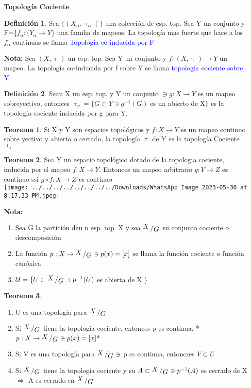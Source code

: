 \documentclass{article}
\theoremstyle{definition}
\newtheorem{definition}{Definición}[section]
\newtheorem{theorem}{Teorema}[section]
\newcommand{\bigslant}[2]{{\raisebox{.2em}{$#1$}\left/\raisebox{-.2em}{$#2$}\right.}}
\begin{document}
\begin{LARGE}
	\textbf{Topología Cociente}
\end{LARGE}
\begin{definition}
	Sea $\{(X_{\alpha},\uptau_{\alpha})\}$ una colección de esp. top. Sea Y un conjunto y F=\{$f_{\alpha}:(Y_{\alpha}\to Y$\} una familia de mapeos. La topología mas fuerte que hace a los $f_{\alpha}$ continuas se llama \textcolor{blue}{Topología co-inducida por F}\label{Topologia coinducida}
\end{definition}
\textbf{Nota: } Sea $(X,\uptau)$ un esp. top. Sea Y un conjunto y $f:(X,\uptau)\to Y$ un mapeo. La topología co-inducida por f sobre Y se llama \textcolor{blue}{topología cociente sobre Y}\label{Top. cociente}
\begin{definition}
	Sean X un esp. top. y Y un conjunto $\ni g:X\to Y$ es un mapeo sobreyectivo, entonces $\uptau_y=\{G\subset Y\ni g^{-1}(G)$ es un abierto de X$\}$ es la topología cociente inducida por g para Y.
\end{definition}
\begin{theorem}
	Si X y Y son espacios topológicos y $f:X\to Y$ es un mapeo continuo sobre yectivo y abierto o cerrado, la topología $\uptau$ de Y es la topología Cociente $\uptau_f$
\end{theorem}
\begin{theorem}
	Sea Y un espacio topológico dotado de la topologia cociente, inducida por el mapeo $f:X\to Y$. Entonces un mapeo arbitrario $g:Y\to Z$ es continuo ssi $g\circ f:X\to Z$ es continuo\\
\texttt{[image: ../../../../../../../../Downloads/WhatsApp Image 2023-05-30 at 8.17.33 PM.jpeg]} 
\end{theorem}
\textbf{Nota: }\\
\begin{enumerate}
	\item Sea G la partición deu n esp. top. X y sea $\bigslant{X}{G}$ su conjunto cociente o descomposición
	\item La función $p: X\to \bigslant{X}{G}\ni p(x)=[x]$ se llama la función cociente o función canónica 
	\item $\mathcal{U}=\{U\subset\bigslant{X}{G}\ni p^{-1}(U)$ es abierta de X $\}$
\end{enumerate}
\begin{theorem}
\hfill
	\begin{enumerate}
		\item U es una topología para $\bigslant{X}{G}$
		\item Si $\bigslant{X}{G}$ tiene la topología cociente, entonces p es continua. *$p:X\to\bigslant{X}{G}\ni p(x)=[x]$*
		\item Si V es una topología para $\bigslant{X}{G}\ni$ p es continua, entoncres $V\subset U$
		\item Si $\bigslant{X}{G}$ tiene la topología cociente y su $A\subset \bigslant{X}{G}\ni p^{-1}(A)$ es cerrado de X $\Rightarrow$ A es cerrado en $\bigslant{X}{G}$
	\end{enumerate}
\end{theorem}
\end{document}
